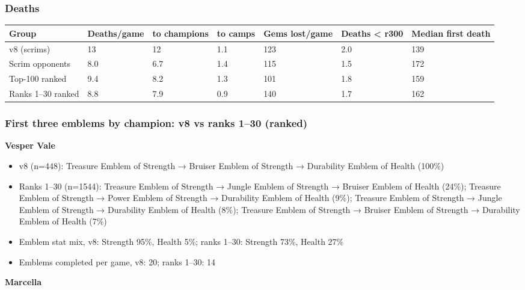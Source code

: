 \documentclass[
  10pt,
]{article}
\newcounter{none} %
\providecommand{\tightlist}{%
  \setlength{\itemsep}{0pt}\setlength{\parskip}{0pt}}
\begin{document}
\subsubsection{Deaths}\label{deaths-1}

{\def\LTcaptype{none} %
\begin{longtable}[]{@{}lllllll@{}}
\toprule\noalign{}
Group & Deaths/game & to champions & to camps & Gems lost/game & Deaths
\textless{} r300 & Median first death \\
\midrule\noalign{}
\endhead
\bottomrule\noalign{}
\endlastfoot
v8 (scrims) & 13 & 12 & 1.1 & 123 & 2.0 & 139 \\
Scrim opponents & 8.0 & 6.7 & 1.4 & 115 & 1.5 & 172 \\
Top-100 ranked & 9.4 & 8.2 & 1.3 & 101 & 1.8 & 159 \\
Ranks 1--30 ranked & 8.8 & 7.9 & 0.9 & 140 & 1.7 & 162 \\
\end{longtable}
}

\subsubsection{First three emblems by champion: v8 vs ranks 1--30
(ranked)}\label{first-three-emblems-by-champion-v8-vs-ranks-130-ranked-1}

\textbf{Vesper Vale}

\begin{itemize}
\tightlist
\item
  v8 (n=448): Treasure Emblem of Strength → Bruiser Emblem of Strength →
  Durability Emblem of Health (100\%)
\item
  Ranks 1--30 (n=1544): Treasure Emblem of Strength → Jungle Emblem of
  Strength → Bruiser Emblem of Health (24\%); Treasure Emblem of
  Strength → Power Emblem of Strength → Durability Emblem of Health
  (9\%); Treasure Emblem of Strength → Jungle Emblem of Strength →
  Durability Emblem of Health (8\%); Treasure Emblem of Strength →
  Bruiser Emblem of Strength → Durability Emblem of Health (7\%)
\item
  Emblem stat mix, v8: Strength 95\%, Health 5\%; ranks 1--30: Strength
  73\%, Health 27\%
\item
  Emblems completed per game, v8: 20; ranks 1--30: 14
\end{itemize}

\textbf{Marcella}
\end{document}
